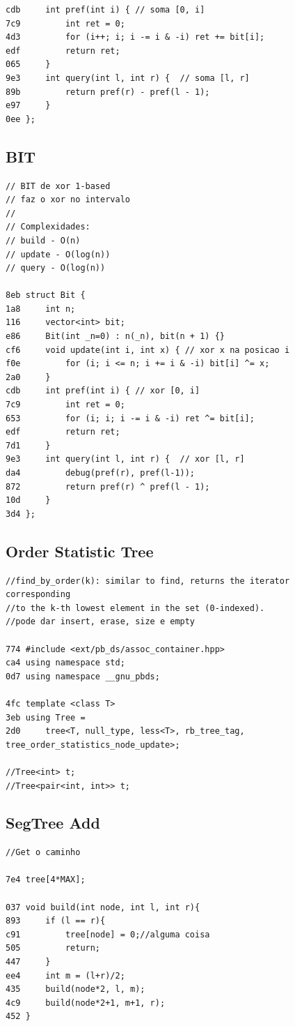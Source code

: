 \documentclass[11pt, a4paper, twoside]{article}
\begin{document}
{\begin{lstlisting}
cdb 	int pref(int i) { // soma [0, i]
7c9 		int ret = 0;
4d3 		for (i++; i; i -= i & -i) ret += bit[i];
edf 		return ret;
065 	}
9e3 	int query(int l, int r) {  // soma [l, r]
89b 		return pref(r) - pref(l - 1); 
e97 	}
0ee };
\end{lstlisting}

\subsection{BIT}
\begin{lstlisting}
// BIT de xor 1-based
// faz o xor no intervalo
//
// Complexidades:
// build - O(n)
// update - O(log(n))
// query - O(log(n))
 
8eb struct Bit {
1a8 	int n;
116 	vector<int> bit;
e86 	Bit(int _n=0) : n(_n), bit(n + 1) {}
cf6 	void update(int i, int x) { // xor x na posicao i
f0e 		for (i; i <= n; i += i & -i) bit[i] ^= x;
2a0 	}
cdb 	int pref(int i) { // xor [0, i]
7c9 		int ret = 0;
653 		for (i; i; i -= i & -i) ret ^= bit[i];
edf 		return ret;
7d1 	}
9e3 	int query(int l, int r) {  // xor [l, r]
da4         debug(pref(r), pref(l-1));
872 		return pref(r) ^ pref(l - 1); 
10d 	}
3d4 };
\end{lstlisting}

\subsection{Order Statistic Tree}
\begin{lstlisting}
//find_by_order(k): similar to find, returns the iterator corresponding 
//to the k-th lowest element in the set (0-indexed).
//pode dar insert, erase, size e empty

774 #include <ext/pb_ds/assoc_container.hpp>
ca4 using namespace std;
0d7 using namespace __gnu_pbds;

4fc template <class T>
3eb using Tree =
2d0     tree<T, null_type, less<T>, rb_tree_tag, tree_order_statistics_node_update>;

//Tree<int> t;
//Tree<pair<int, int>> t;
\end{lstlisting}

\subsection{SegTree Add}
\begin{lstlisting}
//Get o caminho 

7e4 tree[4*MAX];

037 void build(int node, int l, int r){
893     if (l == r){
c91         tree[node] = 0;//alguma coisa
505         return;
447     }
ee4     int m = (l+r)/2;
435     build(node*2, l, m);
4c9     build(node*2+1, m+1, r);
452 }


\end{lstlisting}}
\end{document}
